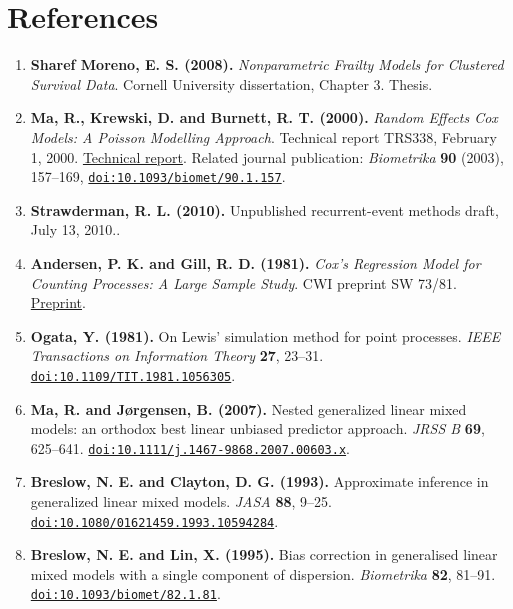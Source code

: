 \documentclass[11pt]{article}
\begin{document}
\section*{References}

\begin{enumerate}
  \item\label{ref:1} \textbf{Sharef Moreno, E. S. (2008).} \emph{Nonparametric Frailty Models for Clustered Survival Data}. Cornell University dissertation, Chapter 3. Thesis.
  \item\label{ref:2} \textbf{Ma, R., Krewski, D. and Burnett, R. T. (2000).} \emph{Random Effects Cox Models: A Poisson Modelling Approach}. Technical report TRS338, February 1, 2000. \href{http://lrsp.carleton.ca/trs/pdffiles/TRS338.pdf}{Technical report}. Related journal publication: \emph{Biometrika} \textbf{90} (2003), 157--169, \href{https://doi.org/10.1093/biomet/90.1.157}{\nolinkurl{doi:10.1093/biomet/90.1.157}}.
  \item\label{ref:3} \textbf{Strawderman, R. L. (2010).} Unpublished recurrent-event methods draft, July 13, 2010..
  \item\label{ref:4} \textbf{Andersen, P. K. and Gill, R. D. (1981).} \emph{Cox's Regression Model for Counting Processes: A Large Sample Study}. CWI preprint SW 73/81. \href{https://ir.cwi.nl/pub/8042/8042D.pdf}{Preprint}.
  \item\label{ref:5} \textbf{Ogata, Y. (1981).} On Lewis' simulation method for point processes. \emph{IEEE Transactions on Information Theory} \textbf{27}, 23--31. \href{https://doi.org/10.1109/TIT.1981.1056305}{\nolinkurl{doi:10.1109/TIT.1981.1056305}}.
  \item\label{ref:6} \textbf{Ma, R. and Jørgensen, B. (2007).} Nested generalized linear mixed models: an orthodox best linear unbiased predictor approach. \emph{JRSS B} \textbf{69}, 625--641. \href{https://doi.org/10.1111/j.1467-9868.2007.00603.x}{\nolinkurl{doi:10.1111/j.1467-9868.2007.00603.x}}.
  \item\label{ref:7} \textbf{Breslow, N. E. and Clayton, D. G. (1993).} Approximate inference in generalized linear mixed models. \emph{JASA} \textbf{88}, 9--25. \href{https://doi.org/10.1080/01621459.1993.10594284}{\nolinkurl{doi:10.1080/01621459.1993.10594284}}.
  \item\label{ref:8} \textbf{Breslow, N. E. and Lin, X. (1995).} Bias correction in generalised linear mixed models with a single component of dispersion. \emph{Biometrika} \textbf{82}, 81--91. \href{https://doi.org/10.1093/biomet/82.1.81}{\nolinkurl{doi:10.1093/biomet/82.1.81}}.

\end{enumerate}
\end{document}
